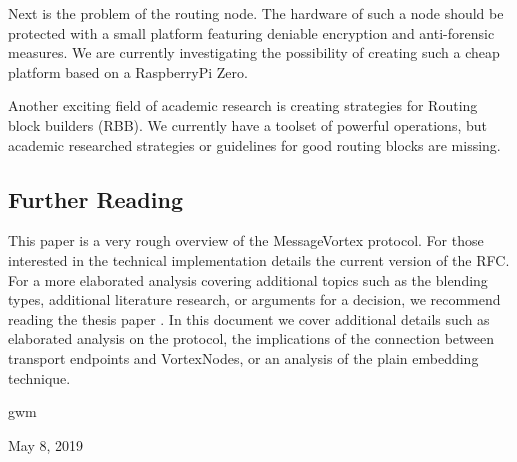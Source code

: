 \documentclass[10pt,journal,compsoc,twocolumn,twoside]{IEEEtran}
\let\MYoriglatexcaption\caption
\renewcommand{\caption}[2][\relax]{\MYoriglatexcaption[#2]{#2}}
\begin{document}
Next is the problem of the routing node. The hardware of such a node should be protected with a small platform featuring deniable encryption and anti-forensic measures. We are currently investigating the possibility of creating such a cheap platform based on a RaspberryPi Zero.

Another exciting field of academic research is creating strategies for Routing block builders (RBB). We currently have a toolset of powerful operations, but academic researched strategies or guidelines for good routing blocks are missing. 

\subsection{Further Reading}
This paper is a very rough overview of the MessageVortex protocol. For those interested in the technical implementation details the current version of the RFC\cite{MessageVortexRFC}. For a more elaborated analysis covering additional topics such as the blending types, additional literature research, or arguments for a decision, we recommend reading the thesis paper \cite{messageVortex}. In this document we cover additional details such as elaborated analysis on the protocol, the implications of the connection between transport endpoints and VortexNodes, or an analysis of the plain embedding technique.

\hfill gwm

\hfill May 8, 2019





%
%
\end{document}
